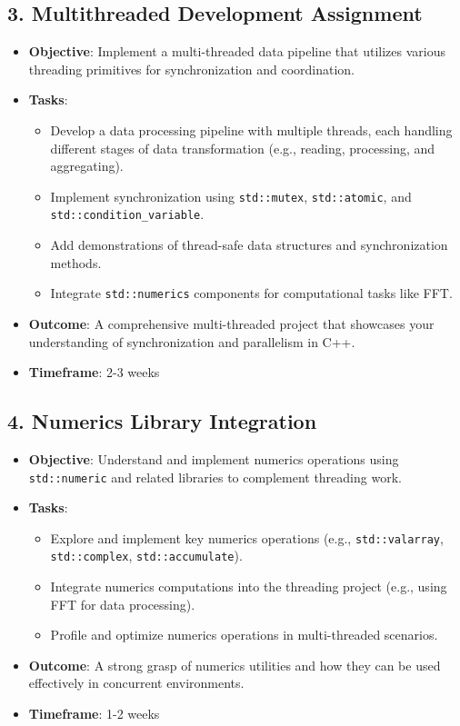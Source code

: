 \documentclass[a4paper,10pt]{article}
\begin{document}
\subsection*{3. Multithreaded Development Assignment}
\begin{itemize}
    \item \textbf{Objective}: Implement a multi-threaded data pipeline that utilizes various threading primitives for synchronization and coordination.
    \item \textbf{Tasks}:
    \begin{itemize}
        \item Develop a data processing pipeline with multiple threads, each handling different stages of data transformation (e.g., reading, processing, and aggregating).
        \item Implement synchronization using \texttt{std::mutex}, \texttt{std::atomic}, and \texttt{std::condition\_variable}.
        \item Add demonstrations of thread-safe data structures and synchronization methods.
        \item Integrate \texttt{std::numerics} components for computational tasks like FFT.
    \end{itemize}
    \item \textbf{Outcome}: A comprehensive multi-threaded project that showcases your understanding of synchronization and parallelism in C++.
    \item \textbf{Timeframe}: 2-3 weeks
\end{itemize}

\subsection*{4. Numerics Library Integration}
\begin{itemize}
    \item \textbf{Objective}: Understand and implement numerics operations using \texttt{std::numeric} and related libraries to complement threading work.
    \item \textbf{Tasks}:
    \begin{itemize}
        \item Explore and implement key numerics operations (e.g., \texttt{std::valarray}, \texttt{std::complex}, \texttt{std::accumulate}).
        \item Integrate numerics computations into the threading project (e.g., using FFT for data processing).
        \item Profile and optimize numerics operations in multi-threaded scenarios.
    \end{itemize}
    \item \textbf{Outcome}: A strong grasp of numerics utilities and how they can be used effectively in concurrent environments.
    \item \textbf{Timeframe}: 1-2 weeks
\end{itemize}
\end{document}
